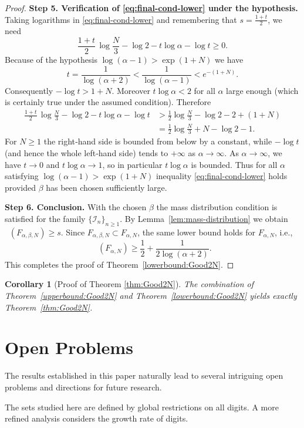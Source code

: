 \documentclass[12pt]{article}
\newtheorem{corollary}[theorem]{Corollary}
\numberwithin{equation}{section}
\DeclareMathOperator{\dimH}{dim_H}
\begin{document}
\begin{proof}
\medskip\noindent
\textbf{Step 5. Verification of \eqref{eq:final-cond-lower} under the hypothesis.}
Taking logarithms in \eqref{eq:final-cond-lower} and remembering that $s=\frac{1+t}{2}$,
we need
\[
\frac{1+t}{2}\,\log\frac{N}{3}-\log2-t\log\alpha-\log t\ge0 .
\]
Because of the hypothesis $\log(\alpha-1)>\exp(1+N)$ we have
\[
t=\frac{1}{\log(\alpha+2)}<\frac{1}{\log(\alpha-1)}<e^{-(1+N)}.
\]
Consequently $-\log t>1+N$.  Moreover $t\log\alpha<2$ for all $\alpha$ large enough
(which is certainly true under the assumed condition).  Therefore
\begin{align*}
\frac{1+t}{2}\,\log\frac{N}{3}-\log2-t\log\alpha-\log t
&> \frac12\log\frac{N}{3}-\log2-2+(1+N) \\
&= \frac12\log\frac{N}{3}+N-\log2-1 .
\end{align*}
For $N\ge1$ the right‑hand side is bounded from below by a constant,
while $-\log t$ (and hence the whole left‑hand side) tends to $+\infty$ as $\alpha\to\infty$. 
As $\alpha \to \infty$, we have $t \to 0$ and $t \log \alpha \to 1$, so in particular $t \log \alpha$ is bounded.
Thus for all $\alpha$ satisfying $\log(\alpha-1)>\exp(1+N)$ inequality \eqref{eq:final-cond-lower}
holds provided $\beta$ has been chosen sufficiently large.

\medskip\noindent
\textbf{Step 6. Conclusion.}
With the chosen $\beta$ the mass distribution condition is satisfied for the family
$\{\mathscr{I}_n\}_{n\ge1}$.  By Lemma~\ref{lem:mass-distribution} we obtain
$\dimH(F_{\alpha,\beta,N})\ge s$.  Since $F_{\alpha,\beta,N}\subset F_{\alpha,N}$,
the same lower bound holds for $F_{\alpha,N}$, i.e.,
\[
\dimH(F_{\alpha,N}) \ge \frac12+\frac{1}{2\log(\alpha+2)} .
\]
This completes the proof of Theorem~\ref{lowerbound:Good2N}.
\end{proof}

\begin{corollary}[Proof of Theorem \ref{thm:Good2N}]
The combination of Theorem~\ref{upperbound:Good2N} and Theorem~\ref{lowerbound:Good2N} 
yields exactly Theorem~\ref{thm:Good2N}.
\end{corollary}


\section{Open Problems}

The results established in this paper naturally lead to several intriguing open problems and directions for future research.

The sets studied here are defined by global restrictions on all digits. A more refined analysis considers the growth rate of digits.
\end{document}
